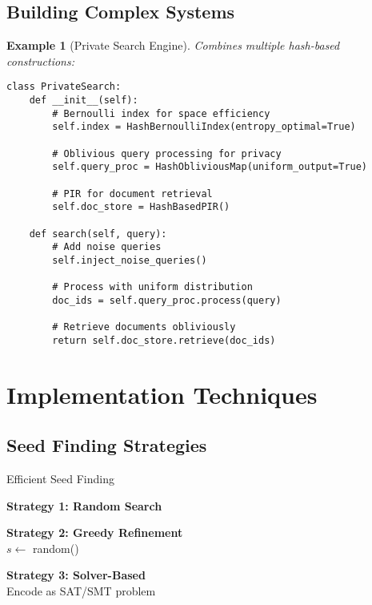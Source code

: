 \documentclass[11pt,final,hidelinks]{article}
\newtheorem{example}[theorem]{Example}
\begin{document}
\subsection{Building Complex Systems}

\begin{example}[Private Search Engine]
Combines multiple hash-based constructions:
\begin{verbatim}
class PrivateSearch:
    def __init__(self):
        # Bernoulli index for space efficiency
        self.index = HashBernoulliIndex(entropy_optimal=True)
        
        # Oblivious query processing for privacy
        self.query_proc = HashObliviousMap(uniform_output=True)
        
        # PIR for document retrieval
        self.doc_store = HashBasedPIR()
        
    def search(self, query):
        # Add noise queries
        self.inject_noise_queries()
        
        # Process with uniform distribution
        doc_ids = self.query_proc.process(query)
        
        # Retrieve documents obliviously
        return self.doc_store.retrieve(doc_ids)
\end{verbatim}
\end{example}

\section{Implementation Techniques}

\subsection{Seed Finding Strategies}

\begin{algorithm}[H]
\caption{Efficient Seed Finding}

\textbf{Strategy 1: Random Search}\\

\textbf{Strategy 2: Greedy Refinement}\\
$s \leftarrow$ random()\;

\textbf{Strategy 3: Solver-Based}\\
Encode as SAT/SMT problem\;
\end{algorithm}
\end{document}
